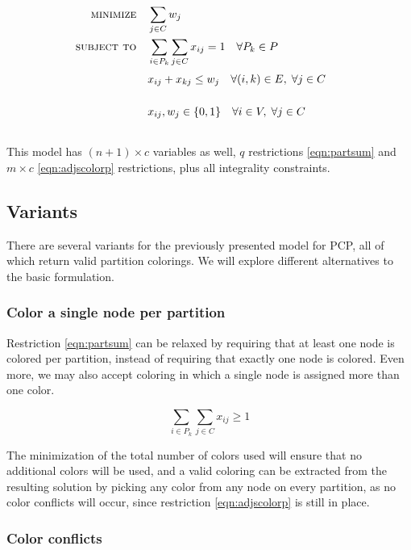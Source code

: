 \begin{align}
\text{\textsc{minimize}} \quad & \sum_{j \in C} w_j \nonumber \\
\text{\textsc{subject to}} \quad & \sum_{i \in P_k} \sum_{j \in C} x_{ij} = 1 \quad \forall P_k \in P \label{eqn:partsum} \\
& x_{ij} + x_{kj} \leq w_j \quad \forall (i,k) \in E, \; \forall j \in C \sumheight \label{eqn:adjscolorp}\\
& x_{ij}, w_{j} \in \{0,1\} \quad \forall i \in V, \; \forall j \in C \sumheight \nonumber
\end{align}

This model has $(n + 1) \times c$ variables as well, $q$ restrictions \ref{eqn:partsum} and $m \times c$ \ref{eqn:adjscolorp} restrictions, plus all integrality constraints.

\subsection{Variants}

There are several variants for the previously presented model for PCP, all of which return valid partition colorings. We will explore different alternatives to the basic formulation.

\subsubsection*{Color a single node per partition}

Restriction \ref{eqn:partsum} can be relaxed by requiring that at least one node is colored per partition, instead of requiring that exactly one node is colored. Even more, we may also accept coloring in which a single node is assigned more than one color. 

\begin{equation}
\label{eqn:partsumgeq}
\sum_{i \in P_k} \sum_{j \in C} x_{ij} \geq 1
\end{equation}

The minimization of the total number of colors used will ensure that no additional colors will be used, and a valid coloring can be extracted from the resulting solution by picking any color from any node on every partition, as no color conflicts will occur, since restriction \ref{eqn:adjscolorp} is still in place.

\subsubsection*{Color conflicts}

